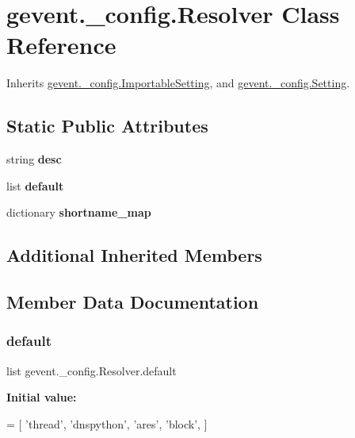\hypertarget{classgevent_1_1__config_1_1_resolver}{}\section{gevent.\+\_\+config.\+Resolver Class Reference}
\label{classgevent_1_1__config_1_1_resolver}


Inherits \hyperlink{classgevent_1_1__config_1_1_importable_setting}{gevent.\+\_\+config.\+Importable\+Setting}, and \hyperlink{classgevent_1_1__config_1_1_setting}{gevent.\+\_\+config.\+Setting}.

\subsection*{Static Public Attributes}
\begin{DoxyCompactItemize}
\item 
string {\bfseries desc}
\item 
list {\bfseries default}
\item 
dictionary {\bfseries shortname\+\_\+map}
\end{DoxyCompactItemize}
\subsection*{Additional Inherited Members}


\subsection{Member Data Documentation}
\mbox{\label{classgevent_1_1__config_1_1_resolver_acaf85b0f710a05863992ae6d8fc9e445}} 
\subsubsection{\texorpdfstring{default}{default}}
{\footnotesize\ttfamily list gevent.\+\_\+config.\+Resolver.\+default\hspace{0.3cm}{\ttfamily [static]}}

{\bfseries Initial value\+:}
\begin{DoxyCode}
=  [
        \textcolor{stringliteral}{'thread'},
        \textcolor{stringliteral}{'dnspython'},
        \textcolor{stringliteral}{'ares'},
        \textcolor{stringliteral}{'block'},
    ]
\end{DoxyCode}
\mbox{\label{classgevent_1_1__config_1_1_resolver_af6fc314a5e0a4a9ed756a33f154f0cae}} 

